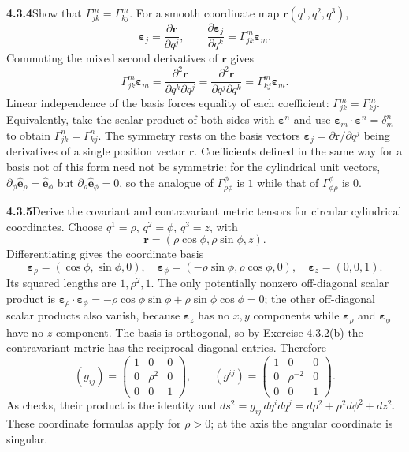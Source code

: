 \par\bigskip
\noindent\textbf{4.3.4}\quad Show that
$\Gamma_{jk}^{m}=\Gamma_{kj}^{m}$.
\solution
For a smooth coordinate map $\mathbf r(q^1,q^2,q^3)$,
\[
\boldsymbol\varepsilon_j=\frac{\partial\mathbf r}{\partial q^j},
\qquad
\frac{\partial\boldsymbol\varepsilon_j}{\partial q^k}
=\Gamma^m_{jk}\boldsymbol\varepsilon_m.
\]
Commuting the mixed second derivatives of $\mathbf r$ gives
\[
\Gamma^m_{jk}\boldsymbol\varepsilon_m
=\frac{\partial^2\mathbf r}{\partial q^k\partial q^j}
=\frac{\partial^2\mathbf r}{\partial q^j\partial q^k}
=\Gamma^m_{kj}\boldsymbol\varepsilon_m.
\]
Linear independence of the basis forces equality of each coefficient:
$\boxed{\Gamma^m_{jk}=\Gamma^m_{kj}}$. Equivalently, take the scalar
product of both sides with $\boldsymbol\varepsilon^n$ and use
$\boldsymbol\varepsilon_m\cdot\boldsymbol\varepsilon^n=\delta^n_m$ to
obtain $\Gamma^n_{jk}=\Gamma^n_{kj}$. The symmetry rests on the basis
vectors $\boldsymbol\varepsilon_j=\partial\mathbf r/\partial q^j$ being
derivatives of a single position vector $\mathbf r$. Coefficients
defined in the same way for a basis not of this form need not be
symmetric: for the cylindrical unit vectors,
$\partial_\phi\hat{\mathbf e}_\rho=\hat{\mathbf e}_\phi$ but
$\partial_\rho\hat{\mathbf e}_\phi=0$, so the analogue of
$\Gamma^\phi_{\rho\phi}$ is $1$ while that of $\Gamma^\phi_{\phi\rho}$
is $0$.

\par\bigskip
\noindent\textbf{4.3.5}\quad Derive the covariant and contravariant metric
tensors for circular cylindrical coordinates.
\solution
Choose $q^1=\rho$, $q^2=\phi$, $q^3=z$, with
\[
\mathbf r=(\rho\cos\phi,\rho\sin\phi,z).
\]
Differentiating gives the coordinate basis
\[
\boldsymbol\varepsilon_\rho=(\cos\phi,\sin\phi,0),\quad
\boldsymbol\varepsilon_\phi=(-\rho\sin\phi,\rho\cos\phi,0),\quad
\boldsymbol\varepsilon_z=(0,0,1).
\]
Its squared lengths are $1,\rho^2,1$. The only potentially nonzero
off-diagonal scalar product is
$\boldsymbol\varepsilon_\rho\cdot\boldsymbol\varepsilon_\phi
=-\rho\cos\phi\sin\phi+\rho\sin\phi\cos\phi=0$;
the other off-diagonal scalar products also vanish, because
$\boldsymbol\varepsilon_z$ has no $x,y$ components while
$\boldsymbol\varepsilon_\rho$ and $\boldsymbol\varepsilon_\phi$ have no
$z$ component. The basis is orthogonal, so by Exercise 4.3.2(b) the
contravariant metric has the reciprocal diagonal entries. Therefore
\[
\boxed{(g_{ij})=\begin{pmatrix}1&0&0\\0&\rho^2&0\\0&0&1\end{pmatrix},
\qquad
(g^{ij})=\begin{pmatrix}1&0&0\\0&\rho^{-2}&0\\0&0&1\end{pmatrix}}.
\]
As checks, their product is the identity and
$ds^2=g_{ij}\,dq^i dq^j=d\rho^2+\rho^2d\phi^2+dz^2$.
These coordinate formulas apply for $\rho>0$; at the axis the angular
coordinate is singular.

